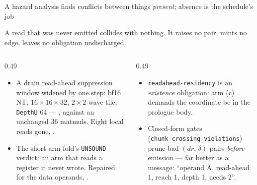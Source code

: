 \begin{frame}{A hazard analysis finds conflicts between things \emph{present}; absence is the schedule's job}

\begin{center}

\vspace{2pt}
{\footnotesize A read that was never emitted collides with nothing. It raises no pair, mints no edge, leaves no obligation undischarged.}
\end{center}

\vspace{-2pt}
\begin{columns}[T]
\begin{column}{0.49\textwidth}
\begin{itemize}\itemsep2pt
  \item A drain read-ahead suppression window widened by one step: bf16 NT, $16{\times}16{\times}32$, $2{\times}2$ wave tile, \texttt{DepthU} 64 --- , against an unchanged 36 matmuls. Eight local reads gone, .
  \item The short-arm fold's \texttt{UNSOUND} verdict: an arm that reads a register it never wrote. Repaired for the data operands, .
\end{itemize}
\end{column}
\begin{column}{0.49\textwidth}
\begin{itemize}\itemsep2pt
  \item \texttt{readahead-residency} is an \emph{existence} obligation: arm (c) demands the coordinate be in the prologue body.
  \item Closed-form gates (\texttt{chunk\_crossing\_violations}) prune bad $(dr,\,\delta)$ pairs \emph{before} emission --- far better as a message: ``operand A, read-ahead 1, reach 1, depth 1, needs 2''.
\end{itemize}
\end{column}
\end{columns}
\end{frame}
